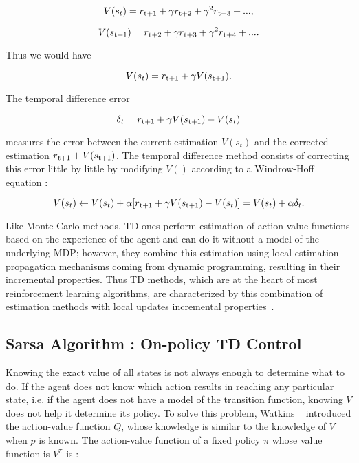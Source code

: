 \begin{equation}
	V(s_t) = r\textsubscript{t+1} + \gamma r\textsubscript{t+2} + \gamma^2 r\textsubscript{t+3} + ...,
\end{equation}

\begin{equation}
	V(s\textsubscript{t+1}) = r\textsubscript{t+2} + \gamma r\textsubscript{t+3} + \gamma^2r\textsubscript{t+4} + ... .
\end{equation}

Thus we would have 

\begin{equation}
	V(s_t) = r\textsubscript{t+1} + \gamma V(s\textsubscript{t+1}).
\end{equation}

The temporal difference error

\begin{equation}
	\delta_t = r\textsubscript{t+1} + \gamma V(s\textsubscript{t+1}) - V(s_t)
\end{equation}

measures the error between the current estimation $V(s_t)$ and the corrected estimation $r\textsubscript{t+1} + V(s\textsubscript{t+1})$. The temporal difference method consists of correcting this error little by little by modifying $V()$ according to a Windrow-Hoff equation :

\begin{equation}
	V(s_t) \leftarrow V(s_t) + \alpha[r\textsubscript{t+1} + \gamma V(s\textsubscript{t+1}) - V(s_t)] = V(s_t) + \alpha \delta_t .
\end{equation}

Like Monte Carlo methods, TD ones perform estimation of action-value functions based on the experience of the agent and can do it without a model of the underlying MDP; however, they combine this estimation using local estimation propagation mechanisms coming from dynamic programming, resulting in their incremental properties. Thus TD methods, which are at the heart of most reinforcement learning algorithms, are characterized by this combination of estimation methods with local updates incremental properties~\cite{Sigaud:2010:MDP:1841781}.

\subsection{Sarsa Algorithm : On-policy TD Control} Knowing the exact value of all states is not always enough to determine what to do. If the agent does not know which action results in reaching any particular state, i.e. if the agent does not have a model of the transition function, knowing $V$ does not help it determine its policy.  To solve this problem, Watkins ~\cite{watkins1992q} introduced the action-value function $Q$, whose knowledge is similar to the knowledge of $V$ when $p$ is known. The action-value function of a fixed policy $\pi$ whose value function is $V^\pi$ is :

